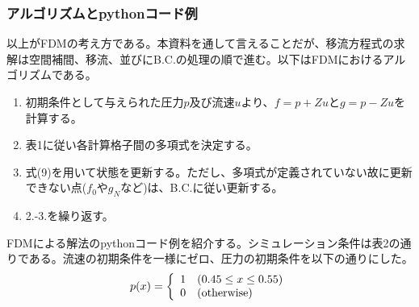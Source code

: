 \documentclass[dvipdfmx, 9pt, a4paper]{jsarticle}
\begin{document}
\subsubsection{アルゴリズムとpythonコード例}
以上がFDMの考え方である。本資料を通して言えることだが、移流方程式の求解は空間補間、移流、並びにB.C.の処理の順で進む。以下はFDMにおけるアルゴリズムである。
\begin{tcolorbox}[title=FDMによる移流方程式の求解]
\begin{enumerate}
\item 初期条件として与えられた圧力$p$及び流速$u$より、$f=p+Zu$と$g=p-Zu$を計算する。
\item 表1に従い各計算格子間の多項式を決定する。
\item 式(9)を用いて状態を更新する。ただし、多項式が定義されていない故に更新できない点($f_0$や$g_N$など)は、B.C.に従い更新する。
\item 2.-3.を繰り返す。
\end{enumerate}
\end{tcolorbox}

\begin{table}[t]
\begin{center}
\caption{シミュレーション条件}
\end{center}
\end{table}

FDMによる解法のpythonコード例を紹介する。シミュレーション条件は表2の通りである。流速の初期条件を一様にゼロ、圧力の初期条件を以下の通りにした。
\begin{equation}
p(x) = \left\{
\begin{array}{ll}
1 & (0.45 \leq x  \leq 0.55)\\
0 & ({\rm otherwise})
\end{array}
\right. \notag
\end{equation}
\end{document}

